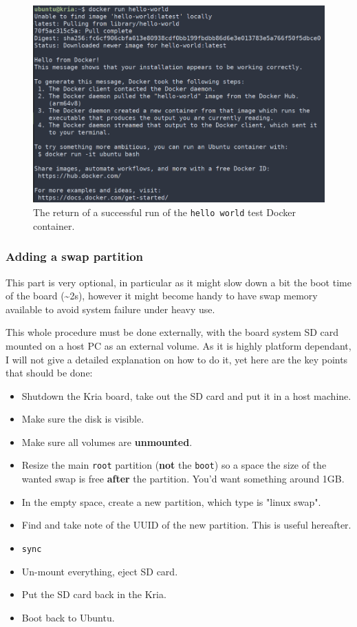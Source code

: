 \documentclass[10pt]{article}
\begin{document}
\begin{figure}[htbp]
\centering
\includegraphics[width=.7\textwidth]{./img/hello-docker.png}
\caption{\label{fig:org3941bd7}The return of a successful run of the \texttt{hello world} test Docker container.}
\end{figure}

\subsubsection{Adding a swap partition}
\label{sec:org2975858}
This part is very optional, in particular as it might slow down a bit the
boot time of the board (\textasciitilde{}2s), however it might become handy to have swap memory
available to avoid system failure under heavy use.

This whole procedure must be done externally, with the board system SD card
mounted on a host PC as an external volume.  As it is highly platform dependant,
I will not give a detailed explanation on how to do it, yet here are the key
points that should be done:
\begin{itemize}
\item Shutdown the Kria board, take out the SD card and put it in a host machine.
\item Make sure the disk is visible.
\item Make sure all volumes are \textbf{unmounted}.
\item Resize the main \texttt{root} partition (\textbf{not} the \texttt{boot}) so a space the size of the
wanted swap is free \textbf{after} the partition. You'd want something around 1GB.
\item In the empty space, create a new partition, which type is "linux swap".
\item Find and take note of the UUID of the new partition. This is useful hereafter.
\item \texttt{sync}
\item Un-mount everything, eject SD card.
\item Put the SD card back in the Kria.
\item Boot back to Ubuntu.
\end{itemize}
\end{document}

